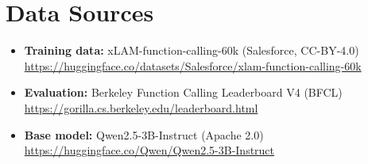 \documentclass[11pt, letterpaper]{article}
\begin{document}
\section*{Data Sources}

\begin{itemize}
  \item \textbf{Training data:} xLAM-function-calling-60k (Salesforce, CC-BY-4.0)\\
    \url{https://huggingface.co/datasets/Salesforce/xlam-function-calling-60k}
  \item \textbf{Evaluation:} Berkeley Function Calling Leaderboard V4 (BFCL)\\
    \url{https://gorilla.cs.berkeley.edu/leaderboard.html}
  \item \textbf{Base model:} Qwen2.5-3B-Instruct (Apache 2.0)\\
    \url{https://huggingface.co/Qwen/Qwen2.5-3B-Instruct}
\end{itemize}
\end{document}
